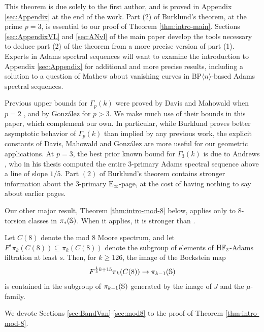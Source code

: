This theorem is due solely to the first author, and is proved in Appendix \ref{sec:Appendix} at the end of the work.  Part (2) of Burklund's theorem, at the prime $p=3$, is essential to our proof of Theorem \ref{thm:intro-main}.  Sections \ref{sec:AppendixVL} and \ref{sec:ANvl} of the main paper develop the tools necessary to deduce part (2) of the theorem from a more precise version of part (1).
Experts in Adams spectral sequences will want to examine the introduction to Appendix \ref{sec:Appendix} for additional and more precise results, including a solution to a question of Mathew about vanishing curves in $\mathrm{BP} \langle n \rangle$-based Adams spectral sequences.

\begin{rmk}
Previous upper bounds for $\Gamma_p(k)$ were proved by Davis and Mahowald when $p=2$ \cite{DM3}, and by Gonz\'alez \cite{Gonzalez} for $p>3$.
We make much use of their bounds in this paper, which complement our own.
In particular, while Burklund proves better asymptotic behavior of $\Gamma_p(k)$ than implied by any previous work, the explicit constants of Davis, Mahowald and Gonz\'alez are more useful for our geometric applications.
At $p=3$, the best prior known bound for $\Gamma_3(k)$ is due to Andrews \cite{Andrews}, who in his thesis computed the entire $3$-primary Adams spectral sequence above a line of slope $1/5$.
Part $(2)$ of Burklund's theorem contains stronger information about the $3$-primary $\mathrm{E}_{\infty}$-page, at the cost of having nothing to say about earlier pages.
\end{rmk}

Our other major result, Theorem \ref{thm:intro-mod-8} below, applies only to $8$-torsion classes in $\pi_*(\operatorname{\mathbb{S}})$.  When it applies, it is stronger than .
\begin{thm} \label{thm:intro-mod-8}
    Let $C(8)$ denote the mod $8$ Moore spectrum, and let $F^s \pi_k (C(8)) \subseteq \pi_k (C(8))$ denote the subgroup of elements of $\mathrm{H}\mathbb{F}_2$-Adams filtration at least $s$.
Then, for $k \geq 126$, the image of the Bockstein map
    \[F^{\frac{1}{5} k + 15} \pi_k (C(8)) \to \pi_{k-1} (\operatorname{\mathbb{S}})\]
is contained in the subgroup of $\pi_{k-1} (\operatorname{\mathbb{S}})$ generated by the image of $J$ and the $\mu$-family.
\end{thm}
We devote Sections \ref{sec:BandVan}-\ref{sec:mod8} to the proof of Theorem \ref{thm:intro-mod-8}.

